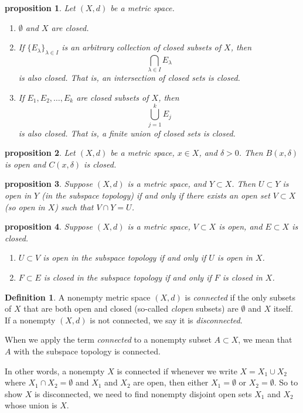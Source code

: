 \documentclass{article}
\newtheorem{proposition}{Proposition}[section]
\newtheorem{proposition}{proposition}[section]
\theoremstyle{definition}
\newtheorem{definition}{Definition}[section]
\theoremstyle{remark}
\begin{document}
\begin{proposition} \label{prop:closed_sets}
Let \( (X, d) \) be a metric space.
\begin{enumerate}
\item \( \emptyset \) and \( X \) are closed.
\item If \( \{ E_{\lambda} \}_{\lambda \in I} \) is an arbitrary collection of closed subsets of \( X \), then
\[
\bigcap_{\lambda \in I} E_{\lambda}
\]
is also closed. That is, an intersection of closed sets is closed.
\item If \( E_1, E_2, \dots, E_k \) are closed subsets of \( X \), then
\[
\bigcup_{j=1}^{k} E_j
\]
is also closed. That is, a finite union of closed sets is closed.
\end{enumerate}
\end{proposition}

\begin{proposition} \label{prop:open_closed_ball}
Let \( (X, d) \) be a metric space, \( x \in X \), and \( \delta > 0 \). Then \( B(x, \delta) \) is open and \( C(x, \delta) \) is closed.
\end{proposition}

\begin{proposition} \label{prop:subspace_topology}
Suppose \( (X, d) \) is a metric space, and \( Y \subset X \). Then \( U \subset Y \) is open in \( Y \) (in the subspace topology) if and only if there exists an open set \( V \subset X \) (so open in \( X \)) such that \( V \cap Y = U \).
\end{proposition}

\begin{proposition} \label{prop:subspace_topology_open_closed}
Suppose \( (X, d) \) is a metric space, \( V \subset X \) is open, and \( E \subset X \) is closed.
\begin{enumerate}
\item \( U \subset V \) is open in the subspace topology if and only if \( U \) is open in \( X \).
\item \( F \subset E \) is closed in the subspace topology if and only if \( F \) is closed in \( X \).
\end{enumerate}
\end{proposition}


\begin{definition} \label{def:connected_space}
A nonempty metric space \( (X, d) \) is \textit{connected} if the only subsets of \( X \) that are both open and closed (so-called \textit{clopen} subsets) are \( \emptyset \) and \( X \) itself. If a nonempty \( (X, d) \) is not connected, we say it is \textit{disconnected}. 

When we apply the term \textit{connected} to a nonempty subset \( A \subset X \), we mean that \( A \) with the subspace topology is connected.

In other words, a nonempty \( X \) is connected if whenever we write \( X = X_1 \cup X_2 \) where \( X_1 \cap X_2 = \emptyset \) and \( X_1 \) and \( X_2 \) are open, then either \( X_1 = \emptyset \) or \( X_2 = \emptyset \). So to show \( X \) is disconnected, we need to find nonempty disjoint open sets \( X_1 \) and \( X_2 \) whose union is \( X \).
\end{definition}
\end{document}
